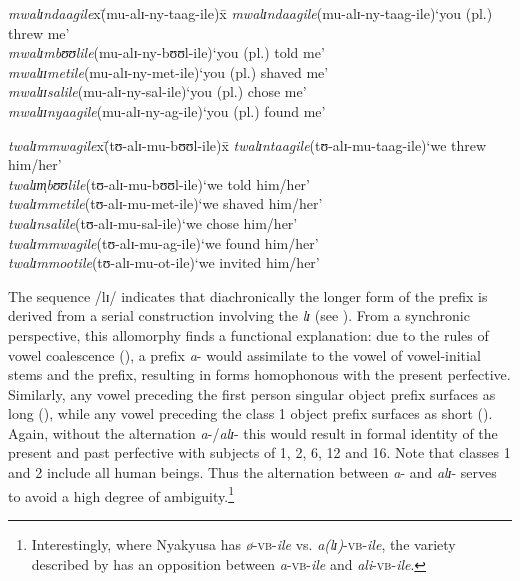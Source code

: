 \begin{exe}
\ex\label{exPSTPFValiOM1SG}
\begin{tabbing}
\textit{mwalɪndaagile}x\=(\degree mu-alɪ-ny-taag-ile)x\=\kill
\textit{mwalɪndaagile}\>(\degree mu-alɪ-ny-taag-ile)\>`you (pl.) threw me'\\
\textit{mwalɪmbʊʊlile}\>(\degree mu-alɪ-ny-bʊʊl-ile)\>`you (pl.) told me'\\
\textit{mwalɪɪmetile}\>(\degree mu-alɪ-ny-met-ile)\>`you (pl.) shaved me'\\
\textit{mwalɪɪsalile}\>(\degree mu-alɪ-ny-sal-ile)\>`you (pl.) chose me'\\
\textit{mwalɪɪnyaagile}\>(\degree mu-alɪ-ny-ag-ile)\>`you (pl.) found me'
\end{tabbing}
\ex\label{exPSTPFValiOMNCL1}
\begin{tabbing}
\textit{twalɪmmwagile}x\=(\degree tʊ-alɪ-mu-bʊʊl-ile)x\=\kill%
\textit{twalɪntaagile}\>(\degree tʊ-alɪ-mu-taag-ile)\>`we threw him/her'\\
\textit{twalɪm̩bʊʊlile}\>(\degree tʊ-alɪ-mu-bʊʊl-ile)\>`we told him/her'\\
\textit{twalɪmmetile}\>(\degree tʊ-alɪ-mu-met-ile)\>`we shaved him/her'\\
\textit{twalɪnsalile}\>(\degree tʊ-alɪ-mu-sal-ile)\>`we chose him/her'\\
\textit{twalɪmmwagile}\>(\degree tʊ-alɪ-mu-ag-ile)\>`we found him/her'\\ 
\textit{twalɪmmootile}\>(\degree tʊ-alɪ-mu-ot-ile)\>`we invited him/her'
\end{tabbing}
\end{exe}

The sequence /lɪ/ indicates that diachronically the longer form of the prefix is derived from a serial construction involving the  \textit{lɪ} (see \citealt{BotneR1986}). From a synchronic perspective, this allomorphy finds a functional explanation: due to the rules of vowel coalescence (), a prefix \textit{a}- would assimilate to the vowel of vowel-initial stems and the  prefix, resulting in forms homophonous with the present perfective. Similarly, any vowel preceding the first person singular object prefix surfaces as long (), while any vowel preceding the class 1 object prefix surfaces as short (). Again, without the alternation \textit{a}-/\textit{alɪ}- this would result in formal identity of the present and past perfective with subjects of  1, 2, 6, 12 and 16. Note that classes 1 and 2 include all human beings. Thus the alternation between \textit{a}- and \textit{alɪ}- serves to avoid a high degree of ambiguity.\footnote{Interestingly, where Nyakyusa has \textit{ø}-\textsc{vb}-\textit{ile} vs. \textit{a(lɪ)}-\textsc{vb}-\textit{ile}, the  variety described by \citet[76f]{KishindoP1999} has an opposition between \textit{a}-\textsc{vb}-\textit{ile} and \textit{ali}-\textsc{vb}-\textit{ile}.}

